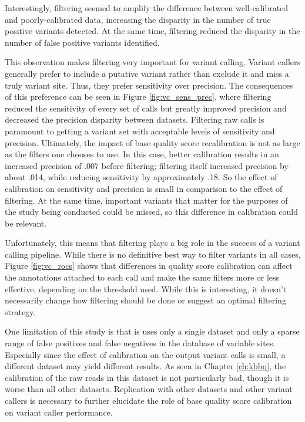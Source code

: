 Interestingly, filtering seemed to amplify the difference between well-calibrated and poorly-calibrated data, increasing the disparity in the number of true positive variants detected. At the same time, filtering reduced the disparity in the number of false positive variants identified.

This observation makes filtering very important for variant calling. Variant callers generally prefer to include a putative variant rather than exclude it and miss a truly variant site. Thus, they prefer sensitivity over precision. The consequences of this preference can be seen in Figure \ref{fig:vc_sens_prec}, where filtering reduced the sensitivity of every set of calls but greatly improved precision and decreased the precision disparity between datasets. Filtering raw calls is paramount to getting a variant set with acceptable levels of sensitivity and precision. Ultimately, the impact of base quality score recalibration is not as large as the filters one chooses to use. In this case, better calibration results in an increased precision of .007 before filtering; filtering itself increased precision by about .014, while reducing sensitivity by approximately .18. So the effect of calibration on sensitivity and precision is small in comparison to the effect of filtering. At the same time, important variants that matter for the purposes of the study being conducted could be missed, so this difference in calibration could be relevant.

Unfortunately, this means that filtering plays a big role in the success of a variant calling pipeline. While there is no definitive best way to filter variants in all cases, Figure \ref{fig:vc_rocs} shows that differences in quality score calibration can affect the annotations attached to each call and make the same filters more or less effective, depending on the threshold used. While this is interesting, it doesn't necessarily change how filtering should be done or suggest an optimal filtering strategy.

One limitation of this study is that is uses only a single dataset and only a sparse range of false positives and false negatives in the database of variable sites. Especially since the effect of calibration on the output variant calls is small, a different dataset may yield different results. As seen in Chapter \ref{ch:kbbq}, the calibration of the raw reads in this dataset is not particularly bad, though it is worse than all other datasets. Replication with other datasets and other variant callers is necessary to further elucidate the role of base quality score calibration on variant caller performance.

